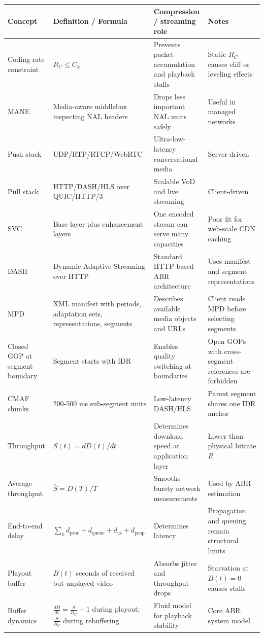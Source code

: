 \begin{center}
\begin{tabular}{|l|l|l|l|}
\hline
\textbf{Concept} & \textbf{Definition / Formula} & \textbf{Compression / streaming role} & \textbf{Notes} \\ \hline
Coding rate constraint & $R_C \leq C_k$ & Prevents packet accumulation and playback stalls & Static $R_C$ causes cliff or leveling effects \\ \hline
MANE & Media-aware middlebox inspecting NAL headers & Drops less important NAL units safely & Useful in managed networks \\ \hline
Push stack & UDP/RTP/RTCP/WebRTC & Ultra-low-latency conversational media & Server-driven \\ \hline
Pull stack & HTTP/DASH/HLS over QUIC/HTTP/3 & Scalable VoD and live streaming & Client-driven \\ \hline
SVC & Base layer plus enhancement layers & One encoded stream can serve many capacities & Poor fit for web-scale CDN caching \\ \hline
DASH & Dynamic Adaptive Streaming over HTTP & Standard HTTP-based ABR architecture & Uses manifest and segment representations \\ \hline
MPD & XML manifest with periods, adaptation sets, representations, segments & Describes available media objects and URLs & Client reads MPD before selecting segments \\ \hline
Closed GOP at segment boundary & Segment starts with IDR & Enables quality switching at boundaries & Open GOPs with cross-segment references are forbidden \\ \hline
CMAF chunks & 200-500 ms sub-segment units & Low-latency DASH/HLS & Parent segment shares one IDR anchor \\ \hline
Throughput & $S(t)=dD(t)/dt$ & Determines download speed at application layer & Lower than physical bitrate $R$ \\ \hline
Average throughput & $\bar{S}=D(T)/T$ & Smooths bursty network measurements & Used by ABR estimation \\ \hline
End-to-end delay & $\sum_k d_{\text{proc}}+d_{\text{queue}}+d_{\text{tx}}+d_{\text{prop}}$ & Determines latency & Propagation and queuing remain structural limits \\ \hline
Playout buffer & $B(t)$ seconds of received but unplayed video & Absorbs jitter and throughput drops & Starvation at $B(t)=0$ causes stalls \\ \hline
Buffer dynamics & $\frac{dB}{dt}=\frac{S}{R_C}-1$ during playout; $\frac{S}{R_C}$ during rebuffering & Fluid model for playback stability & Core ABR system model \\ \hline

\end{tabular}
\end{center}
